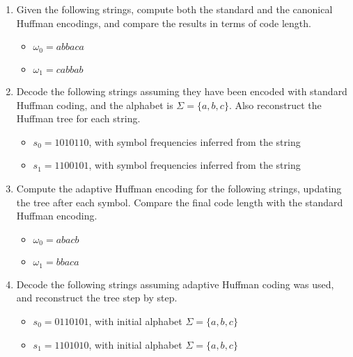 \documentclass{subfiles}
\begin{document}
    \begin{exercises*}
        \begin{enumerate}
            \item Given the following strings, compute both the standard and the 
                canonical Huffman encodings, and compare the results in terms of code length.
                \begin{itemize}
                    \item \(\omega_{0} = abbaca\)
                    \item \(\omega_{1} = cabbab\)
                \end{itemize}

            \item Decode the following strings assuming they have been encoded 
                with standard Huffman coding, and the alphabet is \(\Sigma = \{a, b, c\}\). 
                Also reconstruct the Huffman tree for each string.
                \begin{itemize}
                    \item \(s_{0} = 1010110\), with symbol frequencies inferred from the string
                    \item \(s_{1} = 1100101\), with symbol frequencies inferred from the string
                \end{itemize}

            \item Compute the adaptive Huffman encoding for the following strings,
                updating the tree after each symbol. 
                Compare the final code length with the standard Huffman encoding.
                \begin{itemize}
                    \item \(\omega_{0} = abacb\)
                    \item \(\omega_{1} = bbaca\)
                \end{itemize}

            \item Decode the following strings assuming adaptive Huffman coding was used,
                and reconstruct the tree step by step.
                \begin{itemize}
                    \item \(s_{0} = 0110101\), with initial alphabet \(\Sigma = \{a, b, c\}\)
                    \item \(s_{1} = 1101010\), with initial alphabet \(\Sigma = \{a, b, c\}\)
                \end{itemize}


\end{enumerate}
\end{exercises*}
\end{document}
